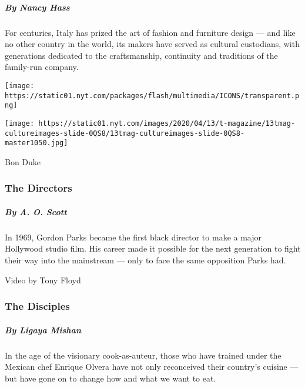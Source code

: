 \hypertarget{by-nancy-hass}{%
\subparagraph{By Nancy Hass}\label{by-nancy-hass}}

For centuries, Italy has prized the art of fashion and furniture design
--- and like no other country in the world, its makers have served as
cultural custodians, with generations dedicated to the craftsmanship,
continuity and traditions of the family-run company.

\href{https://www.nytimes.com/interactive/2020/04/13/t-magazine/gordon-parks.html}{}

\texttt{[image: https://static01.nyt.com/packages/flash/multimedia/ICONS/transparent.png]}

\texttt{[image: https://static01.nyt.com/images/2020/04/13/t-magazine/13tmag-cultureimages-slide-0QS8/13tmag-cultureimages-slide-0QS8-master1050.jpg]}

Bon Duke

\hypertarget{the-directors}{%
\subsubsection{The Directors}\label{the-directors}}

\hypertarget{by-a-o-scott}{%
\subparagraph{By A. O. Scott}\label{by-a-o-scott}}

In 1969, Gordon Parks became the first black director to make a major
Hollywood studio film. His career made it possible for the next
generation to fight their way into the mainstream --- only to face the
same opposition Parks had.

\href{https://www.nytimes.com/interactive/2020/04/13/t-magazine/enrique-olvera-chef.html}{}

Video by Tony Floyd

\hypertarget{the-disciples}{%
\subsubsection{The Disciples}\label{the-disciples}}

\hypertarget{by-ligaya-mishan}{%
\subparagraph{By Ligaya Mishan}\label{by-ligaya-mishan}}

In the age of the visionary cook-as-auteur, those who have trained under
the Mexican chef Enrique Olvera have not only reconceived their
country's cuisine --- but have gone on to change how and what we want to
eat.

\href{https://www.nytimes.com/interactive/2020/04/13/t-magazine/royal-academy-antwerp.html}{}


